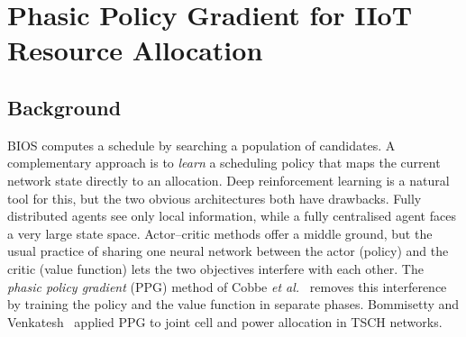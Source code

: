 \section{Phasic Policy Gradient for IIoT Resource Allocation}
\label{sec:ml_ppg}

\subsection{Background}
BIOS computes a schedule by searching a population of candidates. A complementary approach is to \emph{learn} a scheduling policy that maps the current network state directly to an allocation. Deep reinforcement learning is a natural tool for this, but the two obvious architectures both have drawbacks. Fully distributed agents see only local information, while a fully centralised agent faces a very large state space. Actor--critic methods offer a middle ground, but the usual practice of sharing one neural network between the actor (policy) and the critic (value function) lets the two objectives interfere with each other. The \emph{phasic policy gradient} (PPG) method of Cobbe \emph{et al.}~\cite{ml_cobbe2021ppg} removes this interference by training the policy and the value function in separate phases. Bommisetty and Venkatesh~\cite{ml_ppg2022} applied PPG to joint cell and power allocation in TSCH networks.

